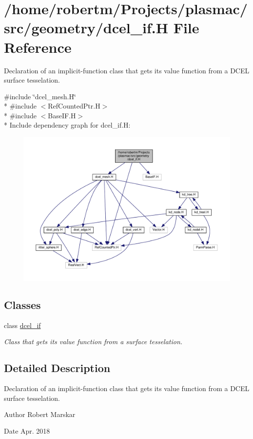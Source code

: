 \hypertarget{dcel__if_8H}{}\section{/home/robertm/\+Projects/plasmac/src/geometry/dcel\+\_\+if.H File Reference}
\label{dcel__if_8H}


Declaration of an implicit-\/function class that gets its value function from a D\+C\+EL surface tesselation.  


{\ttfamily \#include \char`\"{}dcel\+\_\+mesh.\+H\char`\"{}}\\*
{\ttfamily \#include $<$Ref\+Counted\+Ptr.\+H$>$}\\*
{\ttfamily \#include $<$Base\+I\+F.\+H$>$}\\*
Include dependency graph for dcel\+\_\+if.\+H\+:\nopagebreak
\begin{figure}[H]
\begin{center}
\leavevmode
\includegraphics[width=350pt]{dcel__if_8H__incl}
\end{center}
\end{figure}
\subsection*{Classes}
\begin{DoxyCompactItemize}
\item 
class \hyperlink{classdcel__if}{dcel\+\_\+if}
\begin{DoxyCompactList}\small\item\em Class that gets it\textquotesingle{}s value function from a surface tesselation. \end{DoxyCompactList}\end{DoxyCompactItemize}


\subsection{Detailed Description}
Declaration of an implicit-\/function class that gets its value function from a D\+C\+EL surface tesselation. 

\begin{DoxyAuthor}{Author}
Robert Marskar 
\end{DoxyAuthor}
\begin{DoxyDate}{Date}
Apr. 2018 
\end{DoxyDate}
